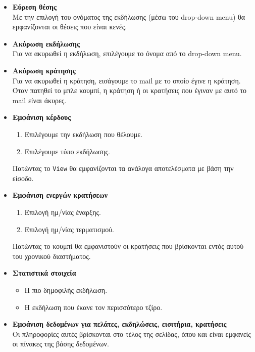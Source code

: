 \documentclass[a4paper, 11pt]{article}
\begin{document}
\begin{itemize}
    \item \textbf{Εύρεση θέσης}\\
    Με την επιλογή του ονόματος της εκδήλωσης (μέσω του drop-down menu) θα εμφανίζονται οι θέσεις που είναι κενές.

    \item \textbf{Ακύρωση εκδήλωσης}\\
    Για να ακυρωθεί η εκδήλωση, επιλέγουμε το όνομα από το drop-down menu.

    \item \textbf{Ακύρωση κράτησης}\\
    Για να ακυρωθεί η κράτηση, εισάγουμε το mail με το οποίο έγινε η κράτηση. Όταν πατηθεί το μπλε κουμπί, η κράτηση ή οι κρατήσεις που έγιναν με αυτό το mail είναι άκυρες.

    \item \textbf{Εμφάνιση κέρδους}
    \begin{enumerate}
        \item Επιλέγουμε την εκδήλωση που θέλουμε.
        \item Επιλέγουμε τύπο εκδήλωσης.
    \end{enumerate}
    Πατώντας το \texttt{View} θα εμφανίζονται τα ανάλογα αποτελέσματα με βάση την είσοδο.

    \item \textbf{Εμφάνιση ενεργών κρατήσεων}
    \begin{enumerate}
        \item Επιλογή ημ/νίας έναρξης.
        \item Επιλογή ημ/νίας τερματισμού.
    \end{enumerate}
    Πατώντας το κουμπί θα εμφανιστούν οι κρατήσεις που βρίσκονται εντός αυτού του χρονικού διαστήματος.

    \item \textbf{Στατιστικά στοιχεία}
    \begin{itemize}
        \item Η πιο δημοφιλής εκδήλωση.
        \item Η εκδήλωση που έκανε τον περισσότερο τζίρο.
    \end{itemize}

    \item \textbf{Εμφάνιση δεδομένων για πελάτες, εκδηλώσεις, εισιτήρια, κρατήσεις}\\
    Οι πληροφορίες αυτές βρίσκονται στο τέλος της σελίδας, όπου και είναι εμφανείς οι πίνακες της βάσης δεδομένων.
\end{itemize}
\end{document}
